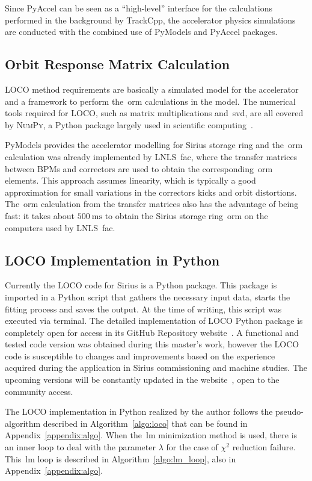 Since PyAccel can be seen as a ``high-level'' interface for the calculations performed in the background by TrackCpp, the accelerator physics simulations are conducted with the combined use of PyModels and PyAccel packages.

\subsection{Orbit Response Matrix Calculation}
LOCO method requirements are basically a simulated model for the accelerator and a framework to perform the~\gls{orm} calculations in the model. The numerical tools required for LOCO, such as matrix multiplications and~\gls{svd}, are all covered by \textsc{NumPy}, a Python package largely used in scientific computing~\cite{numpy}. 

PyModels provides the accelerator modelling for Sirius storage ring and the~\gls{orm} calculation was already implemented by LNLS~\gls{fac}, where the transfer matrices between BPMs and correctors are used to obtain the corresponding~\gls{orm} elements. This approach assumes linearity, which is typically a good approximation for small variations in the correctors kicks and orbit distortions. The~\gls{orm} calculation from the transfer matrices also has the advantage of being fast: it takes about $\SI{500}{\milli\second}$ to obtain the Sirius storage ring~\gls{orm} on the computers used by LNLS~\gls{fac}.

\subsection{LOCO Implementation in Python}
Currently the LOCO code for Sirius is a Python package. This package is imported in a Python script that gathers the necessary input data, starts the fitting process and saves the output. At the time of writing, this script was executed via terminal. The detailed implementation of LOCO Python package is completely open for access in its GitHub Repository website~\cite{locosirius}. A functional and tested code version was obtained during this master's work, however the LOCO code is susceptible to changes and improvements based on the experience acquired during the application in Sirius commissioning and machine studies. The upcoming versions will be constantly updated in the website~\cite{locosirius}, open to the community access.

The LOCO implementation in Python realized by the author follows the pseudo-algorithm described in Algorithm~\ref{algo:loco} that can be found in Appendix~\ref{appendix:algo}. When the~\gls{lm} minimization method is used, there is an inner loop to deal with the parameter $\lambda$ for the case of $\chi^2$ reduction failure. This~\gls{lm} loop is described in Algorithm~\ref{algo:lm_loop}, also in Appendix~\ref{appendix:algo}.

